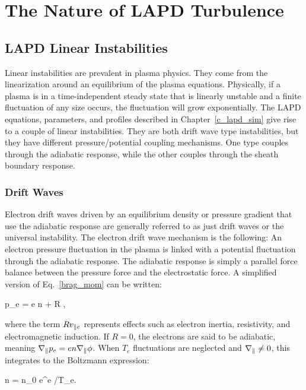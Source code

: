 \chapter{The Nature of LAPD Turbulence}
\label{c_lapd_turb}

\section{LAPD Linear Instabilities}
\label{s_lin_inst}

Linear instabilities are prevalent in plasma physics. They come from the linearization around an equilibrium of the plasma equations. Physically, if a plasma is in a time-independent
steady state that is linearly unstable and a finite fluctuation of any size occurs, the fluctuation will grow exponentially.
The LAPD equations, parameters, and profiles described in Chapter~\ref{c_lapd_sim} give rise to a couple of linear instabilities. They are both drift wave type instabilities, but they 
have different pressure/potential coupling mechanisms. One type couples through the adiabatic response, while the other couples through the sheath boundary response.

\subsection{Drift Waves}
\label{ss_drift_waves}

Electron drift waves driven by an equilibrium density or pressure gradient that use the adiabatic response are generally referred to as just drift waves or the universal instability.
The electron drift wave mechanism is the following: An electron pressure fluctuation in the plasma is linked with a potential fluctuation through the adiabatic response. The adiabatic
response is simply a parallel force balance between the pressure force and the electrostatic force. A simplified version of Eq.~\ref{brag_mom} can be written:

\beq
\label{adiabatic_response}
\gradpar p_e = e n \gradpar \phi + R \vpe,
\eeq

where the term $R v_{\parallel e}$ represents effects such as electron inertia, resistivity, and electromagnetic induction. If $R=0$, the electrons are said to be adiabatic, meaning 
$\nabla_\parallel p_e = e n \nabla_\parallel \phi$. When $T_e$ fluctuations are neglected and $\nabla_\parallel \ne 0$, this integrates to the Boltzmann expression:

\beq
\label{boltzmann_exp}
n = n_0 e^{e \phi/T_e}.
\eeq

